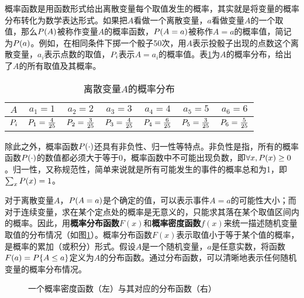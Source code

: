 \parinterval 概率函数是用函数形式给出离散变量每个取值发生的概率，其实就是将变量的概率分布转化为数学表达形式。如果把$A$看做一个离散变量，$a$看做变量$A$的一个取值，那么${P}(A)$被称作变量$A$的概率函数，${P}(A=a)$被称作$A = a$的概率值，简记为${P}(a)$。例如，在相同条件下掷一个骰子50次，用$A$表示投骰子出现的点数这个离散变量，$a_i$表示点数的取值，${P}_i$表示$A=a_i$的概率值。表\ref{tab:2-1}为$A$的概率分布，给出了$A$的所有取值及其概率。

\begin{table}[htp]
\centering
\caption{离散变量$A$的概率分布}
\begin{tabular}{c|c c c c c c}
\rule{0pt}{15pt}     $A$ & $a_1=1$ & $a_2=2$ & $a_3=3$ & $a_4=4$ & $a_5=5$ & $a_6=6$\\
               \hline
\rule{0pt}{15pt}     ${P}_i$ & ${P}_1=\frac{4}{25}$  &  ${P}_2=\frac{3}{25}$ &  ${P}_3=\frac{4}{25}$ & ${P}_4=\frac{6}{25}$ & ${P}_5=\frac{3}{25}$ & ${P}_6=\frac{5}{25}$  \\
             \end{tabular}
             \label{tab:2-1}
\end{table}

\parinterval 除此之外，概率函数${P}(\cdot)$还具有非负性、归一性等特点。非负性是指，所有的概率函数${P}(\cdot)$的数值都必须大于等于0，概率函数中不可能出现负数，即$\forall{x},{P}{(x)}\geq{0}$。归一性，又称规范性，简单来说就是所有可能发生的事件的概率总和为1，即$\sum_{x}{P}{(x)}={1}$。

\parinterval 对于离散变量$A$，${P}(A=a)$是个确定的值，可以表示事件$A=a$的可能性大小；而对于连续变量，求在某个定点处的概率是无意义的，只能求其落在某个取值区间内的概率。因此，用{\small\sffamily\bfseries{概率分布函数}}$F(x)$和{\small\sffamily\bfseries{概率密度函数}}$f(x)$来统一描述随机变量取值的分布情况（如图\ref{fig:2-1}）。概率分布函数$F(x)$表示取值小于等于某个值的概率，是概率的累加（或积分）形式。假设$A$是一个随机变量，$a$是任意实数，将函数$F(a)={P}\{A\leq a\}$定义为$A$的分布函数。通过分布函数，可以清晰地表示任何随机变量的概率分布情况。

\begin{figure}[htp]
\centering
 
\caption{一个概率密度函数（左）与其对应的分布函数（右）}
\label{fig:2-1}
\end{figure}

